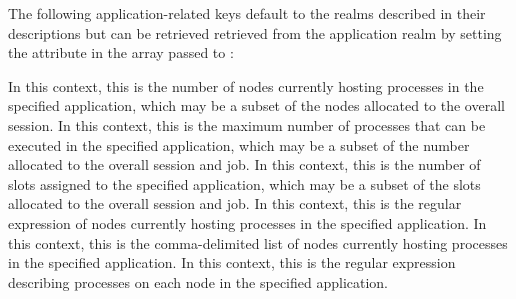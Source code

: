 %
%
%
%
%
%
The following application-related keys default to the realms described in their descriptions but can be
retrieved retrieved from the application realm by setting the  attribute in the  array passed to :

In this context, this is the number of
nodes currently hosting processes in the specified application, which may be a
subset of the nodes allocated to the overall session.
\pasteAttributeItemEnd{}
%
In this context, this is the maximum number of processes that can be executed in the specified application, which may be a subset of the number allocated to the overall session and job.
\pasteAttributeItemEnd{}
%
In this context, this is the number of
slots assigned to the specified application, which may be a subset of the slots
allocated to the overall session and job.
\pasteAttributeItemEnd{}
%
In this context, this is the regular expression of nodes currently hosting processes in the specified application.
\pasteAttributeItemEnd{}
%
In this context, this is the comma-delimited list of nodes currently hosting processes in the specified application.
\pasteAttributeItemEnd{}
%
In this context, this is the regular expression describing processes on each node in the specified application.
\pasteAttributeItemEnd{}

